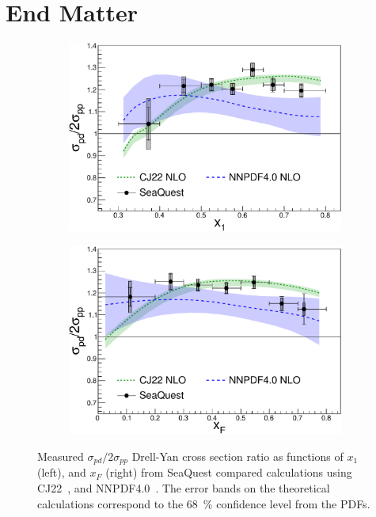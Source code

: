 \documentclass[reprint,aps,unsortedaddress,superscriptaddress,prl,floatfix,showpacs,linenumbers]{revtex4-2}
\begin{document}
\section{End Matter}

\begin{figure}[htbp!]
	\begin{subfigure}{0.45\linewidth}
		\includegraphics[width=\linewidth]{data_full_xB_syst.pdf}
	\end{subfigure}
	\begin{subfigure}{0.45\linewidth}
		\includegraphics[width=\linewidth]{data_full_xF_syst.pdf}
	\end{subfigure}
	\caption{Measured $\sigma_{pd}/2\sigma_{pp}$ Drell-Yan cross section ratio as functions of $x_1$ (left), and $x_F$ (right) 
		from SeaQuest compared calculations using
		CJ22~\cite{accardi2023}, and NNPDF4.0~\cite{ball2022a}.
		The error bands on the theoretical calculations correspond to the \SI{68}{\percent} confidence level from the PDFs.}
	\label{fig:csr_x1_xF}
\end{figure}
\end{document}
